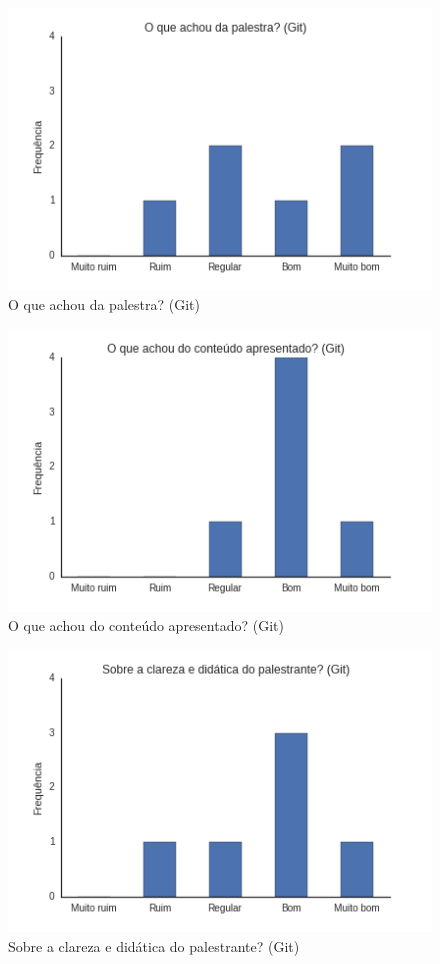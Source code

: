 \documentclass[12pt]{article}
\begin{document}
\begin{figure}[p]
    \centering
    \includegraphics[scale=0.6]{images/git1.png}
    \caption{\label{fig:git1}O que achou da palestra? (Git)}
\end{figure}

\begin{figure}[p]
    \centering
    \includegraphics[scale=0.6]{images/git2.png}
    \caption{\label{fig:git2}O que achou do conteúdo apresentado? (Git)}
\end{figure}

\begin{figure}[p]
    \centering
    \includegraphics[scale=0.6]{images/git3.png}
    \caption{\label{fig:git3}Sobre a clareza e didática do palestrante? (Git)}
\end{figure}
\end{document}
